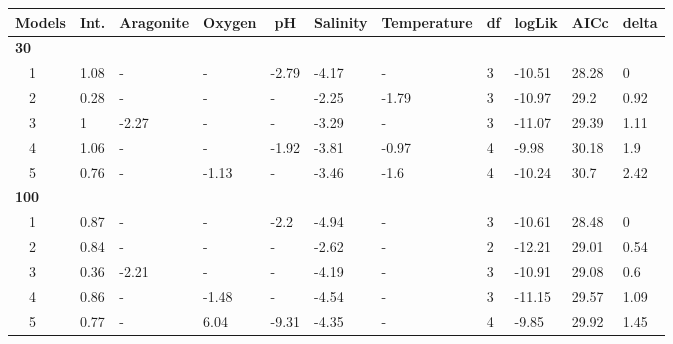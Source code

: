 \documentclass[letterpaper,12pt]{article}\usepackage[]{graphicx}\usepackage[]{color}
\begin{document}
\begin{landscape}
\begin{table}[!tbp]
{\begin{center}
\begin{tabular}{lllllllllll}
\hline\hline
\multicolumn{1}{l}{Models}&\multicolumn{1}{c}{Int.}&\multicolumn{1}{c}{Aragonite}&\multicolumn{1}{c}{Oxygen}&\multicolumn{1}{c}{pH}&\multicolumn{1}{c}{Salinity}&\multicolumn{1}{c}{Temperature}&\multicolumn{1}{c}{df}&\multicolumn{1}{c}{logLik}&\multicolumn{1}{c}{AICc}&\multicolumn{1}{c}{delta}\tabularnewline
\hline
{\bfseries 30}&&&&&&&&&&\tabularnewline
~~1&1.08&-&-&-2.79&-4.17&-&3&-10.51&28.28&0\tabularnewline
~~2&0.28&-&-&-&-2.25&-1.79&3&-10.97&29.2&0.92\tabularnewline
~~3&1&-2.27&-&-&-3.29&-&3&-11.07&29.39&1.11\tabularnewline
~~4&1.06&-&-&-1.92&-3.81&-0.97&4&-9.98&30.18&1.9\tabularnewline
~~5&0.76&-&-1.13&-&-3.46&-1.6&4&-10.24&30.7&2.42\tabularnewline
\hline
{\bfseries 100}&&&&&&&&&&\tabularnewline
~~1&0.87&-&-&-2.2&-4.94&-&3&-10.61&28.48&0\tabularnewline
~~2&0.84&-&-&-&-2.62&-&2&-12.21&29.01&0.54\tabularnewline
~~3&0.36&-2.21&-&-&-4.19&-&3&-10.91&29.08&0.6\tabularnewline
~~4&0.86&-&-1.48&-&-4.54&-&3&-11.15&29.57&1.09\tabularnewline
~~5&0.77&-&6.04&-9.31&-4.35&-&4&-9.85&29.92&1.45\tabularnewline
\hline
\end{tabular}\end{center}}
\end{table}

\end{landscape}
\end{document}
